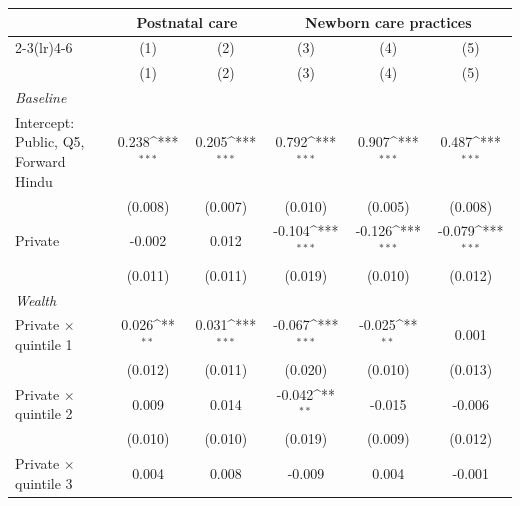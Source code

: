 {
\def\sym#1{\ifmmode^{#1}\else\(^{#1}\)\fi}
\begin{tabular}{l*{5}{c}}
\toprule
            &\multicolumn{2}{c}{Postnatal care}         &\multicolumn{3}{c}{Newborn care practices}                       \\\cmidrule(lr){2-3}\cmidrule(lr){4-6}
            &\multicolumn{1}{c}{(1)}&\multicolumn{1}{c}{(2)}&\multicolumn{1}{c}{(3)}&\multicolumn{1}{c}{(4)}&\multicolumn{1}{c}{(5)}\\
            &\multicolumn{1}{c}{(1)}&\multicolumn{1}{c}{(2)}&\multicolumn{1}{c}{(3)}&\multicolumn{1}{c}{(4)}&\multicolumn{1}{c}{(5)}\\
\midrule
\textit{Baseline}&                     &                     &                     &                     &                     \\
\addlinespace
Intercept: Public, Q5, Forward Hindu&       0.238\sym{***}&       0.205\sym{***}&       0.792\sym{***}&       0.907\sym{***}&       0.487\sym{***}\\
            &     (0.008)         &     (0.007)         &     (0.010)         &     (0.005)         &     (0.008)         \\
\addlinespace
Private     &      -0.002         &       0.012         &      -0.104\sym{***}&      -0.126\sym{***}&      -0.079\sym{***}\\
            &     (0.011)         &     (0.011)         &     (0.019)         &     (0.010)         &     (0.012)         \\
\addlinespace
\textit{Wealth}&                     &                     &                     &                     &                     \\
\addlinespace
Private $\times$ quintile 1&       0.026\sym{**} &       0.031\sym{***}&      -0.067\sym{***}&      -0.025\sym{**} &       0.001         \\
            &     (0.012)         &     (0.011)         &     (0.020)         &     (0.010)         &     (0.013)         \\
\addlinespace
Private $\times$ quintile 2&       0.009         &       0.014         &      -0.042\sym{**} &      -0.015         &      -0.006         \\
            &     (0.010)         &     (0.010)         &     (0.019)         &     (0.009)         &     (0.012)         \\
\addlinespace
Private $\times$ quintile 3&       0.004         &       0.008         &      -0.009         &       0.004         &      -0.001         \\

\end{tabular}}
